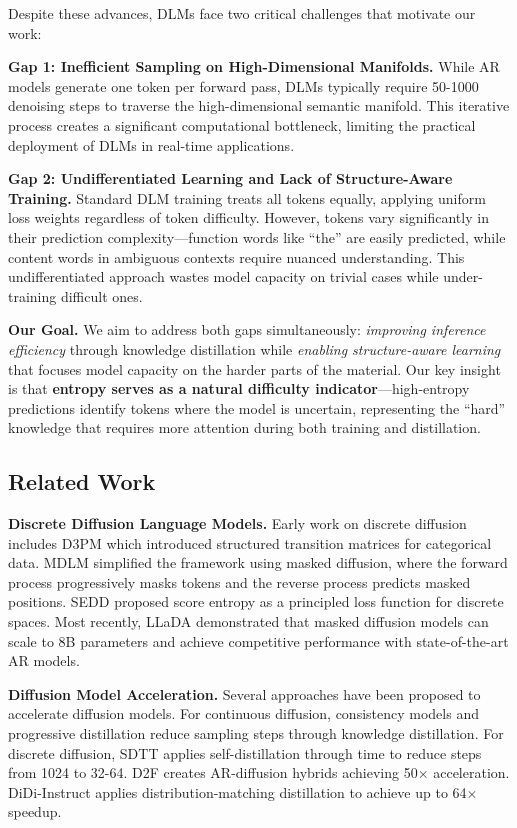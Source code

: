 \documentclass[conference]{IEEEtran}
\begin{document}
Despite these advances, DLMs face two critical challenges that motivate our work:

\textbf{Gap 1: Inefficient Sampling on High-Dimensional Manifolds.} While AR models generate one token per forward pass, DLMs typically require 50-1000 denoising steps to traverse the high-dimensional semantic manifold. This iterative process creates a significant computational bottleneck, limiting the practical deployment of DLMs in real-time applications.

\textbf{Gap 2: Undifferentiated Learning and Lack of Structure-Aware Training.} Standard DLM training treats all tokens equally, applying uniform loss weights regardless of token difficulty. However, tokens vary significantly in their prediction complexity---function words like ``the'' are easily predicted, while content words in ambiguous contexts require nuanced understanding. This undifferentiated approach wastes model capacity on trivial cases while under-training difficult ones.

\textbf{Our Goal.} We aim to address both gaps simultaneously: \textit{improving inference efficiency} through knowledge distillation while \textit{enabling structure-aware learning} that focuses model capacity on the harder parts of the material. Our key insight is that \textbf{entropy serves as a natural difficulty indicator}---high-entropy predictions identify tokens where the model is uncertain, representing the ``hard'' knowledge that requires more attention during both training and distillation.

\subsection{Related Work}

\textbf{Discrete Diffusion Language Models.} Early work on discrete diffusion includes D3PM \cite{austin2021structured} which introduced structured transition matrices for categorical data. MDLM \cite{sahoo2024simple} simplified the framework using masked diffusion, where the forward process progressively masks tokens and the reverse process predicts masked positions. SEDD \cite{lou2024discrete} proposed score entropy as a principled loss function for discrete spaces. Most recently, LLaDA \cite{nie2025llada} demonstrated that masked diffusion models can scale to 8B parameters and achieve competitive performance with state-of-the-art AR models.

\textbf{Diffusion Model Acceleration.} Several approaches have been proposed to accelerate diffusion models. For continuous diffusion, consistency models \cite{song2023consistency} and progressive distillation \cite{salimans2022progressive} reduce sampling steps through knowledge distillation. For discrete diffusion, SDTT \cite{deschenaux2024sdtt} applies self-distillation through time to reduce steps from 1024 to 32-64. D2F \cite{chen2025d2f} creates AR-diffusion hybrids achieving 50$\times$ acceleration. DiDi-Instruct \cite{wang2025didi} applies distribution-matching distillation to achieve up to 64$\times$ speedup.
\end{document}
